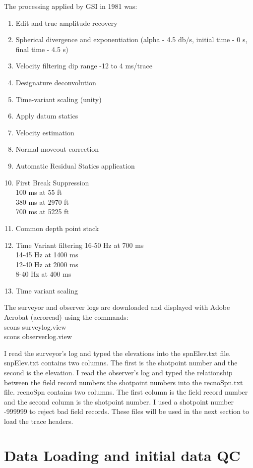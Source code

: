 The processing applied by GSI in 1981 was:
\begin{enumerate}
\item Edit and true amplitude recovery
\item Spherical divergence and exponentiation
(alpha - 4.5 db/s, initial time - 0 s, final time - 4.5 s)
\item Velocity filtering dip range -12 to 4 ms/trace
\item Designature deconvolution
\item Time-variant scaling (unity)
\item Apply datum statics
\item Velocity estimation
\item Normal moveout correction
\item Automatic Residual Statics application
\item First Break Suppression \\
100 ms at 55 ft\\
380 ms at 2970 ft\\
700 ms at 5225 ft
\item Common depth point stack
\item Time Variant filtering
16-50 Hz at 700 ms\\
14-45 Hz at 1400 ms\\
12-40 Hz at 2000 ms\\
8-40 Hz at 400 ms
\item Time variant scaling
\end{enumerate}

The surveyor and observer logs are downloaded and displayed with Adobe 
Acrobat (acroread) using the commands:
\\
scons surveylog.view \\
scons observerlog.view

I read the surveyor's log and typed the elevations into the spnElev.txt 
file.  snpElev.txt contains two columns.  The first is the shotpoint 
number and the second is the elevation.  I read the observer's log and 
typed the relationship between the field record numbers the shotpoint 
numbers into the recnoSpn.txt file.  recnoSpn contains two columns.  The 
first column is the field record number and the second column is the 
shotpoint number. I used a shotpoint number -999999 to reject bad field 
records.  These files will be used in the next section to load the trace 
headers.

\section{Data Loading and initial data QC}

